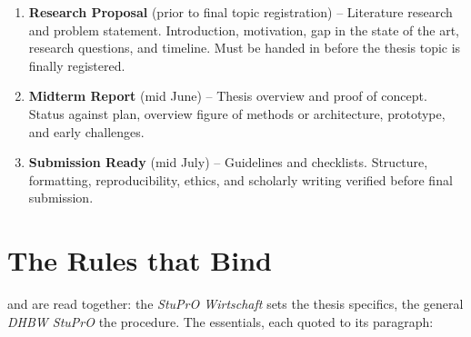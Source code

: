 \documentclass{../sharedAssets/tufte}
\begin{document}
\begin{enumerate}
    \item \textbf{Research Proposal} (prior to final topic registration) -- Literature research and problem statement. Introduction, motivation, gap in the state of the art, research questions, and timeline. Must be handed in before the thesis topic is finally registered. 
    \item \textbf{Midterm Report} (mid June) -- Thesis overview and proof of concept. Status against plan, overview figure of methods or architecture, prototype, and early challenges. 
    \item \textbf{Submission Ready} (mid July) -- Guidelines and checklists. Structure, formatting, reproducibility, ethics, and scholarly writing verified before final submission. 
\end{enumerate}


\section{The Rules that Bind}
 and are read together: the \emph{StuPrO Wirtschaft} sets the thesis specifics, the general \emph{DHBW StuPrO} the procedure. The essentials, each quoted to its paragraph:
\end{document}
